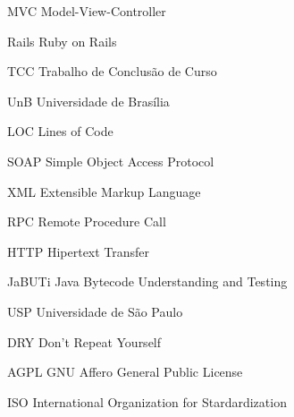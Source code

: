 \begin{siglas}
  
  \item[MVC] Model-View-Controller
  \item[Rails] Ruby on Rails
  \item[TCC] Trabalho de Conclusão de Curso
  \item[UnB] Universidade de Brasília
  \item[LOC] Lines of Code
  \item[SOAP] Simple Object Access Protocol
  \item[XML] Extensible Markup Language
  \item[RPC] Remote Procedure Call
  \item[HTTP] Hipertext Transfer
  \item[JaBUTi] Java Bytecode Understanding and Testing
  \item[USP] Universidade de São Paulo
  \item[DRY] Don't Repeat Yourself
  \item[AGPL] GNU Affero General Public License
  \item[ISO] International Organization for Stardardization
  
\end{siglas}
